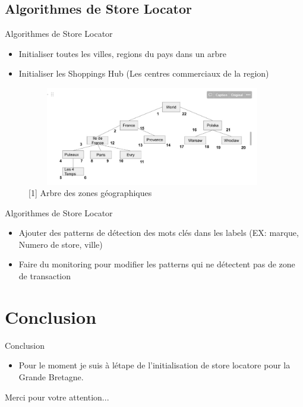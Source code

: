 \documentclass{beamer}
\begin{document}
\subsection{Algorithmes de Store Locator}
\begin{frame}{Algorithmes de Store Locator}
\begin{itemize}
		\item Initialiser toutes les villes, regions du pays dans un arbre
		\item Initialiser les Shoppings Hub (Les centres commerciaux de la region)
\end{itemize}
\begin{figure}[H]
    \includegraphics[width=11cm,height=4.3cm]{images/arbre.jpeg}
    \caption{[1] Arbre des zones géographiques}
    \label{fig:L1}
\end{figure}
\end{frame} 
\begin{frame}{Algorithmes de Store Locator}
\begin{itemize}
		\item Ajouter des patterns de détection des mots clés dans les labels (EX: marque, Numero de store, ville)
		\item Faire du monitoring pour modifier les patterns qui ne détectent pas de zone de transaction
\end{itemize}

\end{frame}





\section{Conclusion}
\begin{frame}{Conclusion}
\begin{itemize}
		\item Pour le moment je suis à létape de l'initialisation de store locatore pour la Grande Bretagne. 
\end{itemize}
\end{frame}


\begin{frame}
  \begin{block}{}
  \centering
  Merci pour votre attention...
  \end{block}
\end{frame}
\end{document}
